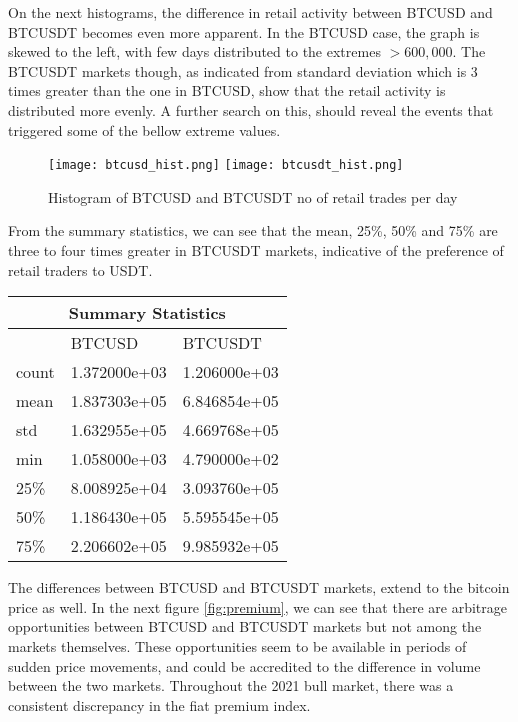 On the next histograms, the difference in retail activity between BTCUSD and BTCUSDT becomes even more apparent. In the BTCUSD case, the graph is skewed to the left, with few days distributed to the extremes \( > 600,000 \). The BTCUSDT markets though, as indicated from standard deviation which is 3 times greater than the one in BTCUSD, show that the retail activity is distributed more evenly.  A further search on this, should reveal the events that triggered some of the bellow extreme values.  

\begin{figure}[H]
	\centering
    \texttt{[image: btcusd\_hist.png]}
    \texttt{[image: btcusdt\_hist.png]}
    \caption{Histogram of BTCUSD and BTCUSDT no of retail trades per day}
    \label{fig:hist}
\end{figure}

From the summary statistics, we can see that the mean, 25\%, 50\% and 75\% are three to four times greater in BTCUSDT markets, indicative of the preference of retail traders to USDT.


\begin{center}
\begin{tabular}{ |p{3cm}||p{3cm}|p{3cm}| }
 \hline
 \multicolumn{3}{|c|}{Summary Statistics} \\
 \hline
  & BTCUSD  & BTCUSDT \\
 \hline
 count   & 1.372000e+03	   &1.206000e+03 \\
 mean &   1.837303e+05	  & 6.846854e+05   \\
 std &1.632955e+05 & 4.669768e+05\\
 min    &1.058000e+03 & 4.790000e+02\\
 25\% &   8.008925e+04  & 3.093760e+05\\
 50\% & 1.186430e+05  & 5.595545e+05   \\
 75\% & 2.206602e+05  & 9.985932e+05\\
 \hline
\end{tabular}
\end{center}


The differences between BTCUSD and BTCUSDT markets, extend to the bitcoin price as well. In the next figure \ref{fig:premium}, we can see that there are arbitrage opportunities between BTCUSD and BTCUSDT markets but not among the markets themselves. These opportunities seem to be available in periods of sudden price movements, and could be accredited to the difference in volume between the two markets. Throughout the 2021 bull market, there was a consistent discrepancy in the fiat premium index.


